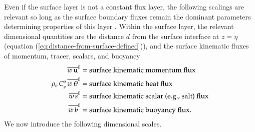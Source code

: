Even if the surface layer is not a constant flux layer, the following
scalings are relevant so long as the surface boundary fluxes remain
the dominant parameters determining properties of this layer
\citep{Tennekes1973}.  Within the surface layer, the relevant
dimensional quantities are the distance $d$ from the surface interface
at $z=\eta$ (equation (\ref{eq:distance-from-surface-defined})), and
the surface kinematic fluxes of momentum, tracer, scalars, and
buoyancy
\begin{align}
  \overline{w \, {\bf u}}^{0} &= \mbox{surface kinematic momentum flux}
\\
 \rho_{o} \, C_{\mbox{\tiny p}}^{o} \, \overline{w \, \theta}^{0} &= \mbox{surface kinematic heat flux}
\\
 \overline{w \, s}^{0} &= \mbox{surface kinematic scalar (e.g., salt) flux}
\\
 \overline{w \, b}^{0} &= \mbox{surface kinematic buoyancy flux.}
\end{align} 
 We now introduce the following dimensional scales.
